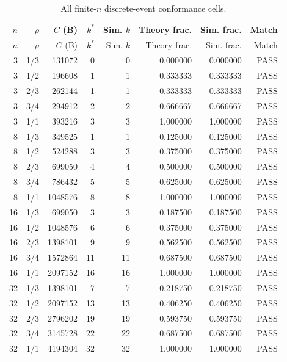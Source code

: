 \begin{longtable}{rrrrrrrr}
\caption{All finite-$n$ discrete-event conformance cells.}\label{tab:scalefull}\\
\toprule
$n$ & $\rho$ & $C$ (B) & $k^*$ & Sim. $k$ & Theory frac. & Sim. frac. & Match \\
\midrule
\endfirsthead
\toprule
$n$ & $\rho$ & $C$ (B) & $k^*$ & Sim. $k$ & Theory frac. & Sim. frac. & Match \\
\midrule
\endhead
3 & 1/3 & 131072 & 0 & 0 & 0.000000 & 0.000000 & PASS \\
3 & 1/2 & 196608 & 1 & 1 & 0.333333 & 0.333333 & PASS \\
3 & 2/3 & 262144 & 1 & 1 & 0.333333 & 0.333333 & PASS \\
3 & 3/4 & 294912 & 2 & 2 & 0.666667 & 0.666667 & PASS \\
3 & 1/1 & 393216 & 3 & 3 & 1.000000 & 1.000000 & PASS \\
8 & 1/3 & 349525 & 1 & 1 & 0.125000 & 0.125000 & PASS \\
8 & 1/2 & 524288 & 3 & 3 & 0.375000 & 0.375000 & PASS \\
8 & 2/3 & 699050 & 4 & 4 & 0.500000 & 0.500000 & PASS \\
8 & 3/4 & 786432 & 5 & 5 & 0.625000 & 0.625000 & PASS \\
8 & 1/1 & 1048576 & 8 & 8 & 1.000000 & 1.000000 & PASS \\
16 & 1/3 & 699050 & 3 & 3 & 0.187500 & 0.187500 & PASS \\
16 & 1/2 & 1048576 & 6 & 6 & 0.375000 & 0.375000 & PASS \\
16 & 2/3 & 1398101 & 9 & 9 & 0.562500 & 0.562500 & PASS \\
16 & 3/4 & 1572864 & 11 & 11 & 0.687500 & 0.687500 & PASS \\
16 & 1/1 & 2097152 & 16 & 16 & 1.000000 & 1.000000 & PASS \\
32 & 1/3 & 1398101 & 7 & 7 & 0.218750 & 0.218750 & PASS \\
32 & 1/2 & 2097152 & 13 & 13 & 0.406250 & 0.406250 & PASS \\
32 & 2/3 & 2796202 & 19 & 19 & 0.593750 & 0.593750 & PASS \\
32 & 3/4 & 3145728 & 22 & 22 & 0.687500 & 0.687500 & PASS \\
32 & 1/1 & 4194304 & 32 & 32 & 1.000000 & 1.000000 & PASS \\
\bottomrule
\end{longtable}
